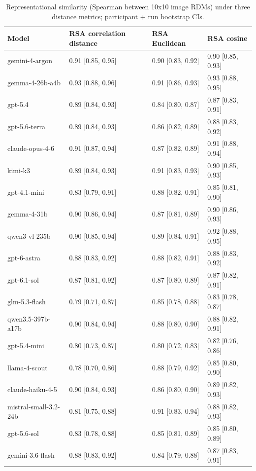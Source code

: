 \begin{table}
\caption{Representational similarity (Spearman between 10x10 image RDMs) under three distance metrics; participant + run bootstrap CIs.}
\begin{tabular}{llll}
\toprule
Model & RSA correlation distance & RSA Euclidean & RSA cosine \\
\midrule
gemini-4-argon & 0.91 [0.85, 0.95] & 0.90 [0.83, 0.92] & 0.90 [0.85, 0.93] \\
gemma-4-26b-a4b & 0.93 [0.88, 0.96] & 0.91 [0.86, 0.93] & 0.93 [0.88, 0.95] \\
gpt-5.4 & 0.89 [0.84, 0.93] & 0.84 [0.80, 0.87] & 0.87 [0.83, 0.91] \\
gpt-5.6-terra & 0.89 [0.84, 0.93] & 0.86 [0.82, 0.89] & 0.88 [0.83, 0.92] \\
claude-opus-4-6 & 0.91 [0.87, 0.94] & 0.87 [0.82, 0.89] & 0.91 [0.88, 0.94] \\
kimi-k3 & 0.89 [0.84, 0.93] & 0.91 [0.83, 0.93] & 0.90 [0.85, 0.93] \\
gpt-4.1-mini & 0.83 [0.79, 0.91] & 0.88 [0.82, 0.91] & 0.85 [0.81, 0.90] \\
gemma-4-31b & 0.90 [0.86, 0.94] & 0.87 [0.81, 0.89] & 0.90 [0.86, 0.93] \\
qwen3-vl-235b & 0.90 [0.85, 0.94] & 0.89 [0.84, 0.91] & 0.92 [0.88, 0.95] \\
gpt-6-astra & 0.88 [0.83, 0.92] & 0.88 [0.82, 0.91] & 0.88 [0.83, 0.92] \\
gpt-6.1-sol & 0.87 [0.81, 0.92] & 0.87 [0.80, 0.89] & 0.87 [0.82, 0.91] \\
glm-5.3-flash & 0.79 [0.71, 0.87] & 0.85 [0.78, 0.88] & 0.83 [0.78, 0.87] \\
qwen3.5-397b-a17b & 0.90 [0.84, 0.94] & 0.88 [0.80, 0.90] & 0.88 [0.82, 0.91] \\
gpt-5.4-mini & 0.80 [0.73, 0.87] & 0.80 [0.72, 0.83] & 0.82 [0.76, 0.86] \\
llama-4-scout & 0.78 [0.70, 0.86] & 0.88 [0.79, 0.92] & 0.85 [0.80, 0.90] \\
claude-haiku-4-5 & 0.90 [0.84, 0.93] & 0.86 [0.80, 0.90] & 0.89 [0.82, 0.93] \\
mistral-small-3.2-24b & 0.81 [0.75, 0.88] & 0.91 [0.83, 0.94] & 0.88 [0.82, 0.93] \\
gpt-5.6-sol & 0.83 [0.78, 0.88] & 0.85 [0.81, 0.89] & 0.85 [0.80, 0.89] \\
gemini-3.6-flash & 0.88 [0.83, 0.92] & 0.84 [0.79, 0.88] & 0.87 [0.83, 0.91] \\

\end{tabular}
\end{table}
